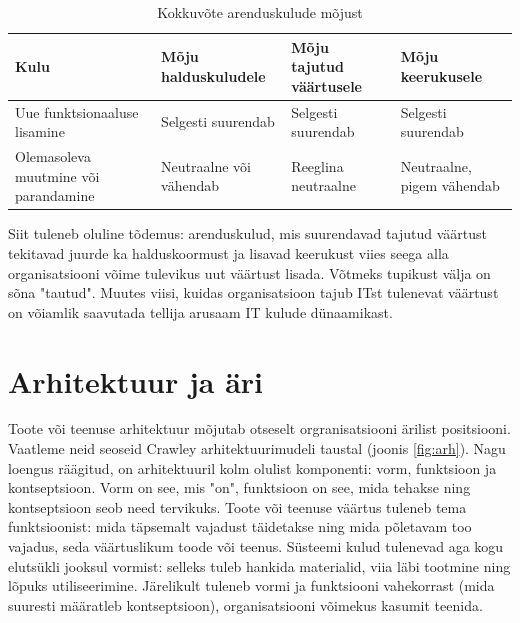 \documentclass{tufte-book}
\begin{document}
\begin{table}
	\begin{center}
		\begin{tabular}{p{3cm}p{1.9cm}p{1.7cm}p{2.2cm}}
		\toprule
Kulu & Mõju \mbox{halduskuludele} & Mõju tajutud väärtusele & Mõju \mbox{keerukusele} \\
\midrule

Uue funktsionaaluse \mbox{lisamine} & Selgesti \mbox{suurendab} & Selgesti \mbox{suurendab} & Selgesti \mbox{suurendab} \\
\addlinespace
Olemasoleva muutmine või parandamine & Neutraalne või vähendab & Reeglina \mbox{neutraalne} & Neutraalne, \mbox{pigem} vähendab \\

\bottomrule
		\end{tabular}
		\caption{Kokkuvõte arenduskulude mõjust}
		\label{tab:arendus}
	\end{center}
\end{table}

Siit tuleneb oluline tõdemus: arenduskulud, mis suurendavad tajutud väärtust tekitavad juurde ka halduskoormust ja lisavad keerukust viies seega alla organisatsiooni võime tulevikus uut väärtust lisada. Võtmeks tupikust välja on sõna "tautud". Muutes viisi, kuidas organisatsioon tajub ITst tulenevat väärtust on võiamlik saavutada tellija arusaam IT kulude dünaamikast. 

\section{Arhitektuur ja äri}
Toote või teenuse arhitektuur mõjutab otseselt orgranisatsiooni ärilist positsiooni. Vaatleme neid seoseid Crawley arhitektuurimudeli taustal (joonis \ref{fig:arh}). Nagu loengus räägitud, on arhitektuuril kolm olulist komponenti: vorm, funktsioon ja kontseptsioon. Vorm on see, mis "on", funktsioon on see, mida tehakse ning kontseptsioon seob need tervikuks. Toote või teenuse väärtus tuleneb tema funktsioonist: mida täpsemalt vajadust täidetakse ning mida põletavam too vajadus, seda väärtuslikum toode või teenus. Süsteemi kulud tulenevad aga kogu elutsükli jooksul vormist: selleks tuleb hankida materialid, viia läbi tootmine ning lõpuks utiliseerimine. Järelikult tuleneb vormi ja funktsiooni vahekorrast (mida suuresti määratleb kontseptsioon), organisatsiooni võimekus kasumit teenida.
\end{document}
